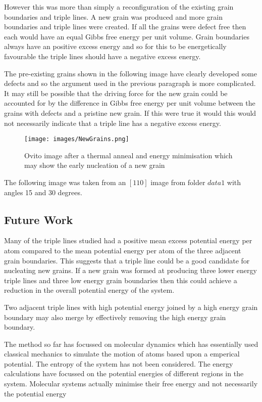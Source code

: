 \documentclass[12pt,a4paper]{book}
\begin{document}
However this was more than simply a reconfiguration of the existing grain boundaries and triple lines. A new grain was produced and more grain boundaries and triple lines were created. If all the grains were defect free then each would have an equal Gibbs free energy per unit volume. Grain boundaries always have an positive excess energy and so for this to be energetically favourable the triple lines should have a negative excess energy.

The pre-existing grains shown in the following image have clearly developed some defects and so the argument used in the previous paragraph is more complicated. It may still be possible that the driving force for the new grain could be accounted for by the difference in Gibbs free energy per unit volume between the grains with defects and a pristine new grain. If this were true it would this would not necessarily indicate that a triple line has a negative excess energy.

\begin{figure}
	\centering
	\texttt{[image: images/NewGrains.png]} 
	\label{fig:NewGrains}
	\caption{Ovito image after a thermal anneal and energy minimisation which may show the early nucleation of a new grain}
\end{figure}

The following image was taken from an $[1 1 0]$ image from folder $data1$ with angles 15 and 30 degrees.


\subsection{Future Work}


Many of the triple lines studied had a positive mean excess potential energy per atom compared to the mean potential energy per atom of the three adjacent grain boundaries. This suggests that a triple line could be a good candidate for nucleating new grains. If a new grain was formed at producing three lower energy triple lines and three low energy grain boundaries then this could achieve a reduction in the overall potential energy of the system.

Two adjacent triple lines with high potential energy joined by a high energy grain boundary may also merge by effectively removing the high energy grain boundary. 


The method so far has focussed on molecular dynamics which has essentially used classical mechanics to simulate the motion of atoms based upon a emperical potential. The entropy of the system has not been considered. The energy calculations have focussed on the potential energies of different regions in the system. Molecular systems actually minimise their free energy and not necessarily the potential energy 
\end{document}
